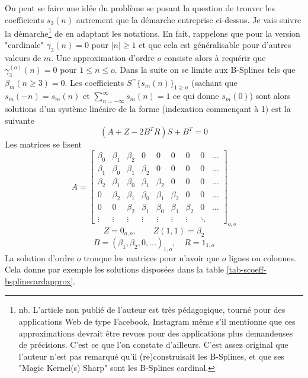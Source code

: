 \documentclass[11pt,twoside]{article}
\begin{document}
On peut se faire une idée du problème se posant la question de trouver les coefficients $s_3(n)$ autrement que la démarche entreprise ci-dessus. Je vais suivre la démarche\footnote{nb. L'article non publié de l'auteur est très pédagogique, tourné pour des applications Web de type Facebook, Instagram même s'il mentionne que ces approximations devrait être revues pour des applications plus demandeuses de précisions. C'est ce que l'on constate d'ailleurs. C'est assez original que l'auteur n'est pas remarqué qu'il (re)construisait les B-Splines, et que ses "Magic Kernel(s) Sharp" sont les B-Splines cardinal.} de \cite{Costella2021} en adaptant les notations. En fait, rappelons que pour la version "cardinale" $\gamma_3(n)=0$ pour $|n|\geq 1$ et que cela est généralisable pour d'autres valeurs de $m$. Une approximation d'ordre $o$ consiste alors à requérir que $\gamma^{(o)}_3(n)=0$ pour $1\leq n\leq o$. Dans la suite on se limite aux  B-Splines tels que $\beta_m(n\geq 3)=0$. Les coefficients $S^=\{s_m(n)\}_{1\geq n}$ (sachant que $s_m(-n)=s_m(n)$ et $\sum_{n=-\infty}^\infty s_m(n)=1$ ce qui donne $s_m(0)$) sont alors solutions d'un système linéaire de la forme (indexation commençant à 1) est la suivante
\begin{equation}
(A+Z-2B^T R)S+B^T = 0
\end{equation}
 Les matrices se lisent 
\begin{equation}
A= \begin{bmatrix}
\beta_0 & \beta_1&\beta_2 & 0 & 0 & 0 & 0 & 0 &\ldots\\
\beta_1 & \beta_0 & \beta_1&\beta_2 & 0 & 0 &0 & 0 &\ldots \\
\beta_2 & \beta_1 & \beta_0 & \beta_1&\beta_2 & 0 & 0&0 & \ldots\\
0 & \beta_2 & \beta_1 & \beta_0 & \beta_1&\beta_2 & 0 &0& \ldots\\
0& 0 & \beta_2 & \beta_1 & \beta_0 & \beta_1&\beta_2 & 0 & \ldots\\
\vdots & \vdots & \vdots  & \vdots & \vdots &\vdots & \vdots & \ddots
\end{bmatrix}_{o,o}
\end{equation}
\begin{equation}
Z = 0_{o,o}, \qquad Z(1,1)=\beta_2
\end{equation}
\begin{equation}
B = (\beta_1,\beta_2,0,\ldots)_{1,o}, \quad R=1_{1,o}
\end{equation}
La solution d'ordre $o$ tronque les matrices pour n'avoir que $o$ lignes ou colonnes. Cela donne par exemple les solutions disposées dans la table \ref{tab-scoeff-bsplinecardapprox}.
\end{document}
